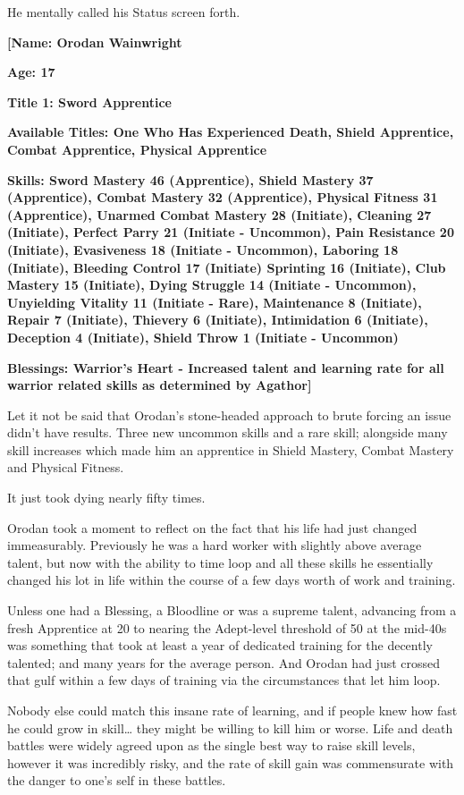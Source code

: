 \documentclass[a4paper,10pt]{book}
\begin{document}
He mentally called his Status screen forth.\par
\textbf{[Name: Orodan Wainwright}\par
\textbf{Age: 17}\par
\textbf{Title 1: Sword Apprentice}\par
\textbf{Available Titles: One Who Has Experienced Death, Shield Apprentice, Combat Apprentice, Physical Apprentice}\par
\textbf{Skills: Sword Mastery 46 (Apprentice), Shield Mastery 37 (Apprentice), Combat Mastery 32 (Apprentice), Physical Fitness 31 (Apprentice), Unarmed Combat Mastery 28 (Initiate), Cleaning 27 (Initiate), Perfect Parry 21 (Initiate - Uncommon), Pain Resistance 20 (Initiate), Evasiveness 18 (Initiate - Uncommon), Laboring 18 (Initiate), Bleeding Control 17 (Initiate) Sprinting 16 (Initiate), Club Mastery 15 (Initiate), Dying Struggle 14 (Initiate - Uncommon), Unyielding Vitality 11 (Initiate - Rare), Maintenance 8 (Initiate), Repair 7 (Initiate), Thievery 6 (Initiate), Intimidation 6 (Initiate), Deception 4 (Initiate), Shield Throw 1 (Initiate - Uncommon)}\par
\textbf{Blessings: Warrior’s Heart - Increased talent and learning rate for all warrior related skills as determined by Agathor]}\par
Let it not be said that Orodan’s stone-headed approach to brute forcing an issue didn’t have results. Three new uncommon skills and a rare skill; alongside many skill increases which made him an apprentice in Shield Mastery, Combat Mastery and Physical Fitness.\par
It just took dying nearly fifty times.\par
Orodan took a moment to reflect on the fact that his life had just changed immeasurably. Previously he was a hard worker with slightly above average talent, but now with the ability to time loop and all these skills he essentially changed his lot in life within the course of a few days worth of work and training.\par
Unless one had a Blessing, a Bloodline or was a supreme talent, advancing from a fresh Apprentice at 20 to nearing the Adept-level threshold of 50 at the mid-40s was something that took at least a year of dedicated training for the decently talented; and many years for the average person. And Orodan had just crossed that gulf within a few days of training via the circumstances that let him loop.\par
Nobody else could match this insane rate of learning, and if people knew how fast he could grow in skill… they might be willing to kill him or worse. Life and death battles were widely agreed upon as the single best way to raise skill levels, however it was incredibly risky, and the rate of skill gain was commensurate with the danger to one’s self in these battles.\par
\end{document}
